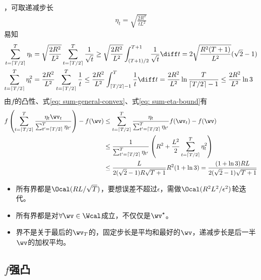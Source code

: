 \documentclass{ctexart}
\begin{document}
，可取递减步长
\begin{align*}
    \eta_t = \sqrt{\frac{2 R^2}{t L^2}}
\end{align*}
易知
\begin{align} \label{eq: sum-eta-bound}
    \begin{split}
        \sum_{t=\lceil T/2 \rceil}^T \eta_t   & = \sqrt{\frac{2 R^2}{L^2}} \sum_{t=\lceil T/2 \rceil}^T \frac{1}{\sqrt{t}} \ge \sqrt{\frac{2 R^2}{L^2}} \int_{(T+1)/2}^{T+1} \frac{1}{\sqrt{t}} \diff t = 2 \sqrt{\frac{R^2 (T+1)}{L^2}} (\sqrt{2} - 1)               \\
        \sum_{t=\lceil T/2 \rceil}^T \eta_t^2 & = \frac{2 R^2}{L^2} \sum_{t=\lceil T/2 \rceil}^T \frac{1}{t} \le \frac{2 R^2}{L^2} \int_{\lceil T/2 \rceil-1}^T \frac{1}{t} \diff t = \frac{2 R^2}{L^2} \ln \frac{T}{\lceil T/2 \rceil-1} \le \frac{2 R^2}{L^2} \ln 3
    \end{split}
\end{align}
由$f$的凸性、式\eqref{eq: sum-general-convex}、式\eqref{eq: sum-eta-bound}有
\begin{align*}
    f \left( \sum_{t=\lceil T/2 \rceil}^T \frac{\eta_t \wv_t}{\sum_{t'=\lceil T/2 \rceil}^T \eta_{t'}} \right) - f(\wv)
     & \le \sum_{t=\lceil T/2 \rceil}^T \frac{\eta_t}{\sum_{t'=\lceil T/2 \rceil}^T \eta_{t'}} f(\wv_t) - f(\wv)                      \\
     & \le \frac{1}{\sum_{t'=\lceil T/2 \rceil}^T \eta_{t'}} \left( R^2 + \frac{L^2}{2} \sum_{t=\lceil T/2 \rceil}^T \eta_t^2 \right) \\
     & \le \frac{L}{2 (\sqrt{2} - 1) R \sqrt{T+1}} R^2 (1 + \ln 3) = \frac{(1 + \ln 3)RL}{2 (\sqrt{2} - 1) \sqrt{T+1}}
\end{align*}

\begin{remark}
    \begin{itemize}
        \item 所有界都是$\Ocal(RL/\sqrt{T})$，要想误差不超过$\epsilon$，需做$\Ocal(R^2 L^2/\epsilon^2)$轮迭代。
        \item 所有界都是对$\forall \wv \in \Wcal$成立，不仅仅是$\wv^\star$。
        \item 界不是关于最后的$\wv_T$的，固定步长是平均和最好的$\wv$，递减步长是后一半$\wv$的加权平均。
    \end{itemize}
\end{remark}

\subsection{$f$强凸}
\end{document}
